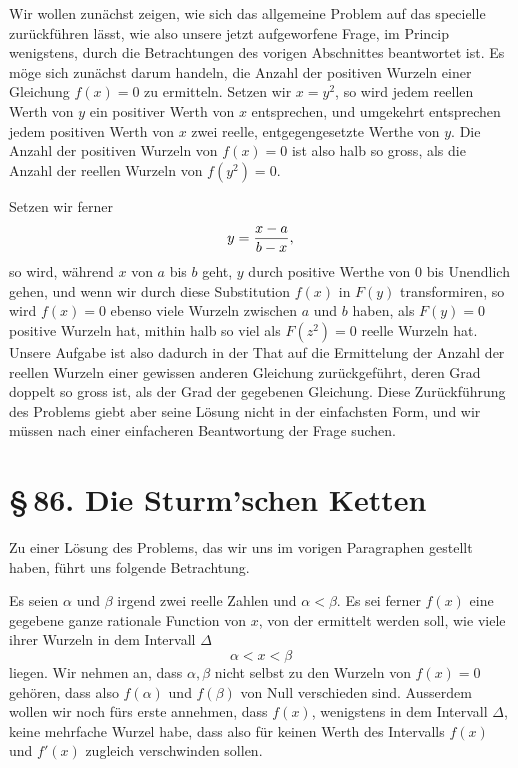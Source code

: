 \documentclass[11pt]{article}
\providecommand{\sect}[2]{\section*{\S\,#1. #2}}
\begin{document}
Wir wollen zun\"achst zeigen, wie sich das allgemeine Problem auf das specielle zur\"uckf\"uhren l\"asst, wie also unsere jetzt aufgeworfene Frage, im Princip wenigstens, durch die Betrachtungen des vorigen Abschnittes beantwortet ist. Es m\"oge sich zun\"achst darum handeln, die Anzahl der positiven Wurzeln einer Gleichung $f(x)=0$ zu ermitteln. Setzen wir $x=y^2$, so wird jedem reellen Werth von $y$ ein positiver Werth von $x$ entsprechen, und umgekehrt entsprechen jedem positiven Werth von $x$ zwei reelle, entgegengesetzte Werthe von $y$. Die Anzahl der positiven Wurzeln von $f(x)=0$ ist also halb so gross, als die Anzahl der reellen Wurzeln von $f(y^2)=0$.

Setzen wir ferner
\[
        y={x-a\over b-x},
\]
so wird, w\"ahrend $x$ von $a$ bis $b$ geht, $y$ durch positive Werthe von $0$ bis Unendlich gehen, und wenn wir durch diese Substitution $f(x)$ in $F(y)$ transformiren, so wird $f(x)=0$ ebenso viele Wurzeln zwischen $a$ und $b$ haben, als $F(y)=0$ positive Wurzeln hat, mithin halb so viel als $F(z^2)=0$ reelle Wurzeln hat. Unsere Aufgabe ist also dadurch in der That auf die Ermittelung der Anzahl der reellen Wurzeln einer gewissen anderen Gleichung zur\"uckgef\"uhrt, deren Grad doppelt so gross ist, als der Grad der gegebenen Gleichung. Diese Zur\"uckf\"uhrung des Problems giebt aber seine L\"osung nicht in der einfachsten Form, und wir m\"ussen nach einer einfacheren Beantwortung der Frage suchen.

\sect{86}{Die Sturm'schen Ketten}

Zu einer L\"osung des Problems, das wir uns im vorigen Paragraphen gestellt haben, f\"uhrt uns folgende Betrachtung.

Es seien $\alpha$ und $\beta$ irgend zwei reelle Zahlen und $\alpha<\beta$. Es sei ferner $f(x)$ eine gegebene ganze rationale Function von $x$, von der ermittelt werden soll, wie viele ihrer Wurzeln in dem Intervall $\Delta$
\[
        \alpha<x<\beta
\]
liegen. Wir nehmen an, dass $\alpha,\beta$ nicht selbst zu den Wurzeln von $f(x)=0$ geh\"oren, dass also $f(\alpha)$ und $f(\beta)$ von Null verschieden sind. Ausserdem wollen wir noch f\"urs erste annehmen, dass $f(x)$, wenigstens in dem Intervall $\Delta$, keine mehrfache Wurzel habe, dass also f\"ur keinen Werth des Intervalls $f(x)$ und $f'(x)$ zugleich verschwinden sollen.
\end{document}
